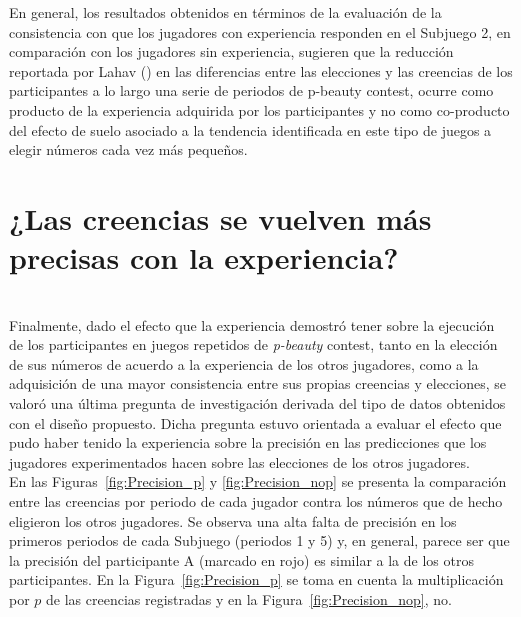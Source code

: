 En general, los resultados obtenidos en términos de la evaluación de la consistencia con que los jugadores con experiencia responden en el Subjuego 2, en comparación con los jugadores sin experiencia, sugieren que la reducción reportada por Lahav (\citeyear{Lahav}) en las diferencias entre las elecciones y las creencias de los participantes a lo largo una serie de periodos de p-beauty contest, ocurre como producto de la experiencia adquirida por los participantes y no como co-producto del efecto de suelo asociado a la tendencia identificada en este tipo de juegos a elegir números cada vez más pequeños.

\section{¿Las creencias se vuelven más precisas con la experiencia?}\\

Finalmente, dado el efecto que la experiencia demostró tener sobre la ejecución de los participantes en juegos repetidos de \textit{p-beauty} contest, tanto en la elección de sus números de acuerdo a la experiencia de los otros jugadores, como a la adquisición de una mayor consistencia entre sus propias creencias y elecciones, se valoró una última pregunta de investigación derivada del tipo de datos obtenidos con el diseño propuesto. Dicha pregunta estuvo orientada a evaluar el efecto que pudo haber tenido la experiencia sobre la precisión en las predicciones que los jugadores experimentados hacen sobre las elecciones de los otros jugadores.\\

En las Figuras~\ref{fig:Precision_p} y \ref{fig:Precision_nop} se presenta la comparación entre las creencias por periodo de cada jugador contra los números que de hecho eligieron los otros jugadores. Se observa una alta falta de precisión en los primeros periodos de cada Subjuego (periodos 1 y 5) y, en general, parece ser que la precisión del participante A (marcado en rojo) es similar a la de los otros participantes. En la Figura~\ref{fig:Precision_p} se toma en cuenta la multiplicación por $p$ de las creencias registradas y en la Figura~\ref{fig:Precision_nop}, no.\\
   
